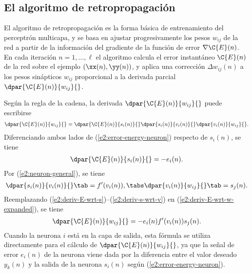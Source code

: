 %
%
\subsection{El algoritmo de retropropagación}
%
El algoritmo de retropropagación es la forma básica de entrenamiento
del perceptrón multicapa, y se basa en ajustar progresivamente los
pesos $w_{ij}$ de la red a partir de la información del gradiente de
la función de error $\nabla\C{E}(n)$.
En cada iteración $n=1,\ldots,\ell$ el algoritmo calcula el error
instantáneo $\C{E}(n)$ de la red sobre el ejemplo $(\xx(n),\yy(n))$, y
aplica una corrección $\Delta{}w_{ij}(n)$ a los pesos sinápticos
$w_{ij}$ proporcional a la derivada parcial
$\dpar{\C{E}(n)}{w_{ij}}{}$.

Según la regla de la cadena, la derivada $\dpar{\C{E}(n)}{w_{ij}}{}$
puede escribirse
%
\begin{align}\label{e2:deriv-E-wrt-w-expanded}
  \dpar{\C{E}(n)}{w_{ij}}{} = \dpar{\C{E}(n)}{s_i(n)}{}
  \dpar{s_i(n)}{v_i(n)}{} \dpar{v_i(n)}{w_{ij}}{}.
\end{align}
%
Diferenciando ambos lados de (\ref{e2:error-energy-neuron}) respecto
de $s_i(n)$, se tiene
%
\begin{align}\label{e2:deriv-E-wrt-s}
  \dpar{\C{E}(n)}{s_i(n)}{} = -e_i(n).
\end{align}
%
Por (\ref{e2:neuron-general}), se tiene
%
\begin{align}\label{e2:deriv-s-wrt-v}
  \dpar{s_i(n)}{v_i(n)}{} \tab = f'(v_i(n)),\tabs
  \dpar{v_i(n)}{w_{ij}}{} \tab = s_j(n).
\end{align}
%
Reemplazando (\ref{e2:deriv-E-wrt-s})--(\ref{e2:deriv-s-wrt-v}) en
(\ref{e2:deriv-E-wrt-w-expanded}), se tiene
%
\begin{align}\label{e2:deriv-E-wrt-w}
  \dpar{\C{E}(n)}{w_{ij}}{} = -e_i(n) f'(v_i(n)) s_j(n).
\end{align}
%
Cuando la neurona $i$ está en la capa de salida, esta fórmula se
utiliza directamente para el cálculo de $\dpar{\C{E}(n)}{w_{ij}}{}$,
ya que la señal de error $e_i(n)$ de la neurona viene dada por la
diferencia entre el valor deseado $y_k(n)$ y la salida de la neurona
$s_i(n)$ según (\ref{e2:error-energy-neuron}).

